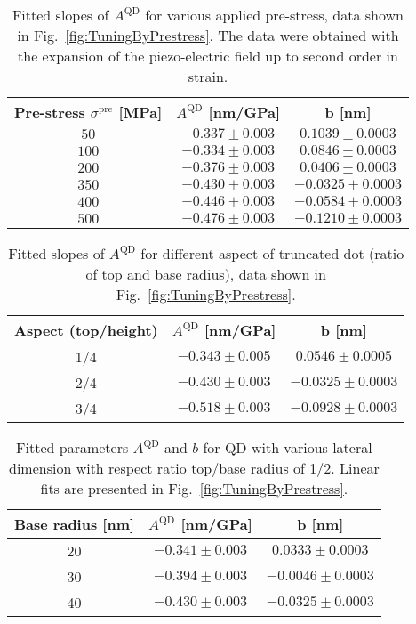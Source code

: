  		\begin{table}[ht!]
 			\centering
 			\caption{Fitted slopes of $A^{\mathrm{QD}}$ for various applied pre-stress, data shown in Fig.~\ref{fig:TuningByPrestress}. The data were obtained with the expansion of the piezo-electric field up to second order in strain.}
 			\label{tab:prestress_slopes}
 			\begin{tabular}{|c|c|c|}
 				\hline
 				Pre-stress $\sigma^\mathrm{pre}$ [MPa]		& $A^{\mathrm{QD}}$ [nm/GPa]    & b   [nm]    \\ \hline
 				$50$  &$-0.337 \pm 0.003$  & $0.1039 \pm 0.0003 $    \\ \hline
 				$100$	&$-0.334 \pm 0.003$  & $0.0846 \pm 0.0003 $     \\ \hline
 				$200$  &$-0.376 \pm 0.003$  & $0.0406\pm 0.0003 $    \\ \hline
 				$350$	&$-0.430 \pm 0.003$  & $-0.0325 \pm 0.0003$      \\ \hline
 				$400$  &$-0.446 \pm 0.003$  & $-0.0584 \pm 0.0003$    \\ \hline
 				$500$	&$-0.476 \pm 0.003$  & $-0.1210 \pm 0.0003$      \\ \hline
 			\end{tabular}    
 		\end{table}
 		
 		
 		
 		\begin{table}[ht!]
 			\centering
 			\caption{Fitted slopes of $A^{\mathrm{QD}}$ for different aspect of truncated dot (ratio of top and base radius), data shown in Fig.~\ref{fig:TuningByPrestress}.}
 			\label{tab:aspect_slopes}
 			\begin{tabular}{|c|c|c|}
 				\hline
 				Aspect (top/height) 	& $A^{\mathrm{QD}}$ [nm/GPa]    & b   [nm]    \\ \hline
 				1/4	&$-0.343\pm0.005$ &	$0.0546	\pm	0.0005$\\ \hline
 				2/4	&$-0.430\pm0.003$ &	$-0.0325 \pm		0.0003$\\ \hline
 				3/4	&$-0.518\pm0.003$ &	$-0.0928	\pm 0.0003$\\ \hline
 			\end{tabular}    
 		\end{table}
 		
 		\begin{table}[ht!]
 			\centering
 			\caption{Fitted parameters $A^{\mathrm{QD}}$ and $b$ for QD with various lateral dimension with respect ratio top/base radius of 1/2. Linear fits are presented in Fig.~\ref{fig:TuningByPrestress}.}
 			\label{tab:lateral_slopes}
 			\begin{tabular}{|c|c|c|}
 				\hline
 				Base radius [nm]	& $A^{\mathrm{QD}}$ [nm/GPa]    & b   [nm]    \\ \hline
			20&	$-0.341\pm0.003$&	$0.0333\pm		0.0003$\\ \hline
			30&	$-0.394\pm0.003$&	$-0.0046\pm	0.0003$\\ \hline
			40&	$-0.430\pm0.003$&	$-0.0325	\pm	0.0003$ \\ \hline
 			\end{tabular}    
 		\end{table}
 		
